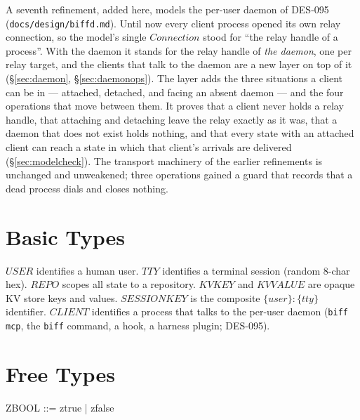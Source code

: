 \documentclass[a4paper,10pt,fleqn]{article}
\begin{document}
A seventh refinement, added here, models the per-user daemon of DES-095
(\texttt{docs/design/biffd.md}).  Until now every client process opened
its own relay connection, so the model's single $Connection$ stood for
``the relay handle of a process''.  With the daemon it stands for the
relay handle of \emph{the daemon}, one per relay target, and the clients
that talk to the daemon are a new layer on top of it
(\S\ref{sec:daemon}, \S\ref{sec:daemonops}).  The layer adds the three
situations a client can be in --- attached, detached, and facing an absent
daemon --- and the four operations that move between them.  It proves that
a client never holds a relay handle, that attaching and detaching leave
the relay exactly as it was, that a daemon that does not exist holds
nothing, and that every state with an attached client can reach a state in
which that client's arrivals are delivered (\S\ref{sec:modelcheck}).  The
transport machinery of the earlier refinements is unchanged and unweakened;
three operations gained a guard that records that a dead process dials and
closes nothing.

\section{Basic Types}

\begin{zed}
\end{zed}

$USER$ identifies a human user.  $TTY$ identifies a terminal
session (random 8-char hex).  $REPO$ scopes all state to a
repository.  $KVKEY$ and $KVVALUE$ are opaque KV store keys and
values.  $SESSIONKEY$ is the composite $\{user\}:\{tty\}$ identifier.
$CLIENT$ identifies a process that talks to the per-user daemon
(\texttt{biff mcp}, the \texttt{biff} command, a hook, a harness
plugin; DES-095).

\section{Free Types}

\begin{zed}
  ZBOOL ::= ztrue | zfalse
\end{zed}
\end{document}
